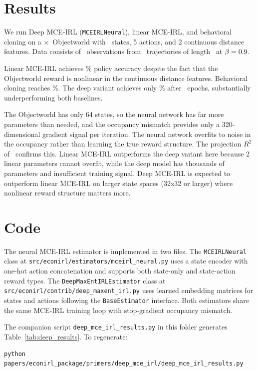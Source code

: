 \documentclass[10pt]{article}
\begin{document}
\section{Results}



We run Deep MCE-IRL (\texttt{MCEIRLNeural}), linear MCE-IRL, and behavioral cloning on a \deepGridSize$\times$\deepGridSize\ Objectworld with \deepNstates\ states, 5 actions, and 2 continuous distance features. Data consists of \deepNobs\ observations from \deepNdemos\ trajectories of length \deepTrajLen\ at $\beta = 0.9$.

Linear MCE-IRL achieves \deepMcePolicyAcc\% policy accuracy despite the fact that the Objectworld reward is nonlinear in the continuous distance features. Behavioral cloning reaches \deepBcPolicyAcc\%. The deep variant achieves only \deepDeepPolicyAcc\% after \deepDeepEpochs\ epochs, substantially underperforming both baselines.

The Objectworld has only 64 states, so the neural network has far more parameters than needed, and the occupancy mismatch provides only a 320-dimensional gradient signal per iteration. The neural network overfits to noise in the occupancy rather than learning the true reward structure. The projection $R^2$ of \deepDeepProjectionR\ confirms this. Linear MCE-IRL outperforms the deep variant here because 2 linear parameters cannot overfit, while the deep model has thousands of parameters and insufficient training signal. Deep MCE-IRL is expected to outperform linear MCE-IRL on larger state spaces (32x32 or larger) where nonlinear reward structure matters more.


\section{Code}

The neural MCE-IRL estimator is implemented in two files. The \texttt{MCEIRLNeural} class at \texttt{src/econirl/estimators/mceirl\_neural.py} uses a state encoder with one-hot action concatenation and supports both state-only and state-action reward types. The \texttt{DeepMaxEntIRLEstimator} class at \texttt{src/econirl/contrib/deep\_maxent\_irl.py} uses learned embedding matrices for states and actions following the \texttt{BaseEstimator} interface. Both estimators share the same MCE-IRL training loop with stop-gradient occupancy mismatch.

The companion script \texttt{deep\_mce\_irl\_results.py} in this folder generates Table~\ref{tab:deep_results}. To regenerate:
\begin{verbatim}
python papers/econirl_package/primers/deep_mce_irl/deep_mce_irl_results.py
\end{verbatim}




\end{document}
